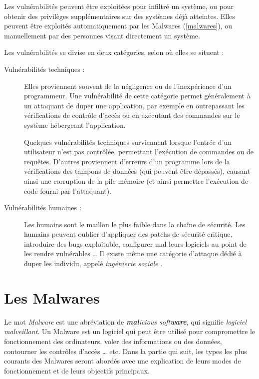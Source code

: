     Les vulnérabilités peuvent être exploitées pour infiltré un système, ou pour obtenir des privilèges supplémentaires
    sur des systèmes déjà atteintes. Elles peuvent être exploités automatiquement par les Malwares 
    (\autoref{malwares}), ou manuellement par des personnes visant directement un système.

    Les vulnérabilités se divise en deux catégories, selon où elles se situent :
    
    \begin{description}
        \item[Vulnérabilités techniques :] Elles proviennent souvent de la négligence ou de l'inexpérience d'un 
            programmeur. Une vulnérabilité de cette catégorie permet généralement à un attaquant de duper 
            une application, par exemple en outrepassant les vérifications de contrôle d'accès ou en exécutant
            des commandes sur le système hébergeant l'application.
            \label{buffer_overflow}

            Quelques vulnérabilités techniques surviennent lorsque l'entrée d'un utilisateur n'est pas contrôlée,
            permettant l'exécution de commandes ou de requêtes. D'autres proviennent d'erreurs d'un programme
            lors de la vérifications des tampons de données (qui peuvent être dépassés), 
            causant ainsi une corruption de la pile mémoire
            (et ainsi permettre l'exécution de code fourni par l'attaquant). \cite{vulnerabilites}

        \item[Vulnérabilités humaines :] Les humains sont le maillon le plus faible dans la chaîne de sécurité.
            Les humains peuvent oublier d'appliquer des patchs de sécurité critique, introduire des bugs
            exploitable, configurer mal leurs logiciels au point de les rendre vulnérables \ldots{}
            Il existe même une catégorie d'attaque dédié à duper les individu, appelé \emph{ingénierie sociale} 
            \cite{bases_hacking}.
    \end{description}

\section{Les Malwares} \label{malwares}
    Le mot \emph{Malware} est une abréviation de \emph{\textbf{mal}icious soft\textbf{ware}}, qui signifie 
    \emph{logiciel malveillant}. Un Malware est un logiciel qui peut être utilisé pour compromettre le
    fonctionnement des ordinateurs, voler des informations ou des données, contourner les contrôles d'accès
    \ldots{} etc. Dans la partie qui suit, les types les plus courants des Malwares seront abordés avec une explication 
    de leurs modes de fonctionnement et de leurs objectifs principaux. \cite{malware_types}%

